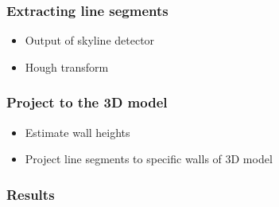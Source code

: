 \documentclass{beamer}
\begin{document}
\frame
{
	\frametitle{Extracting line segments}
	\begin{itemize}
	\item <+-| alert@+> Output of skyline detector
	\item <+-| alert@+> Hough transform
	\end{itemize}


}


\frame
{
	\frametitle{Project to the 3D model}
	\begin{itemize}
	\item <+-| alert@+> Estimate wall heights 
	\item <+-| alert@+> Project line segments to specific walls of 3D model
	\end{itemize}
}


\frame
{
}


\frame
{
	\frametitle{Results}
}
\end{document}
